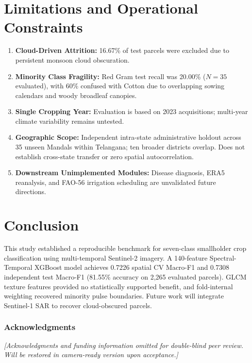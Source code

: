 \documentclass[runningheads]{llncs}
\begin{document}
\section{Limitations and Operational Constraints}
\begin{enumerate}
    \item \textbf{Cloud-Driven Attrition:} 16.67\% of test parcels were excluded due to persistent monsoon cloud obscuration.
    \item \textbf{Minority Class Fragility:} Red Gram test recall was 20.00\% ($N=35$ evaluated), with 60\% confused with Cotton due to overlapping sowing calendars and woody broadleaf canopies.
    \item \textbf{Single Cropping Year:} Evaluation is based on 2023 acquisitions; multi-year climate variability remains untested.
    \item \textbf{Geographic Scope:} Independent intra-state administrative holdout across 35 unseen Mandals within Telangana; ten broader districts overlap. Does not establish cross-state transfer or zero spatial autocorrelation.
    \item \textbf{Downstream Unimplemented Modules:} Disease diagnosis, ERA5 reanalysis, and FAO-56 irrigation scheduling are unvalidated future directions.
\end{enumerate}

\section{Conclusion}
This study established a reproducible benchmark for seven-class smallholder crop classification using multi-temporal Sentinel-2 imagery. A 140-feature Spectral-Temporal XGBoost model achieves 0.7226 spatial CV Macro-F1 and 0.7308 independent test Macro-F1 (81.55\% accuracy on 2,265 evaluated parcels). GLCM texture features provided no statistically supported benefit, and fold-internal weighting recovered minority pulse boundaries. Future work will integrate Sentinel-1 SAR to recover cloud-obscured parcels.

\subsubsection*{Acknowledgments}
\emph{[Acknowledgments and funding information omitted for double-blind peer review. Will be restored in camera-ready version upon acceptance.]}
\end{document}
